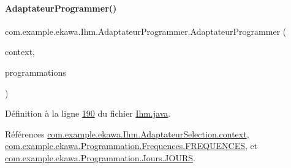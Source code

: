 \paragraph{\texorpdfstring{Adaptateur\+Programmer()}{AdaptateurProgrammer()}}
{\footnotesize\ttfamily com.\+example.\+ekawa.\+Ihm.\+Adaptateur\+Programmer.\+Adaptateur\+Programmer (\begin{DoxyParamCaption}\item[{Activity}]{context,  }\item[{Array\+List$<$ \hyperlink{classcom_1_1example_1_1ekawa_1_1_programmation}{Programmation} $>$}]{programmations }\end{DoxyParamCaption})}



Définition à la ligne \hyperlink{_ihm_8java_source_l00190}{190} du fichier \hyperlink{_ihm_8java_source}{Ihm.\+java}.



Références \hyperlink{_ihm_8java_source_l00152}{com.\+example.\+ekawa.\+Ihm.\+Adaptateur\+Selection.\+context}, \hyperlink{_programmation_8java_source_l00067}{com.\+example.\+ekawa.\+Programmation.\+Frequences.\+F\+R\+E\+Q\+U\+E\+N\+C\+ES}, et \hyperlink{_programmation_8java_source_l00047}{com.\+example.\+ekawa.\+Programmation.\+Jours.\+J\+O\+U\+RS}.


